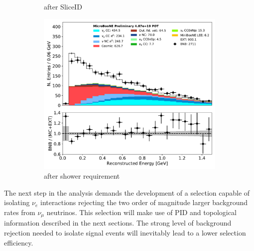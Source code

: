\documentclass[a4paper]{article}
\begin{document}
\begin{figure}[ht]
\begin{center}
\begin{subfigure}[b]{0.31\textwidth}
    \caption{\label{fig:nuereco:sliceid} after SliceID}
    \end{subfigure}
    \begin{subfigure}[b]{0.31\textwidth}
    \centering
    \includegraphics[width=1.00\textwidth]{nureco/reco_e_01152020.pdf}
    \caption{\label{fig:nuereco:shower} after shower requirement}
    \end{subfigure}
\caption{\label{fig:nuereco}}
\end{center}
\end{figure}

\par The next step in the analysis demands the development of a selection capable of isolating $\nu_e$ interactions rejecting the two order of magnitude larger background rates from $\nu_{\mu}$ neutrinos. This selection will make use of PID and topological information described in the next sections. The strong level of background rejection needed to isolate signal events will inevitably lead to a lower selection efficiency.
\end{document}
